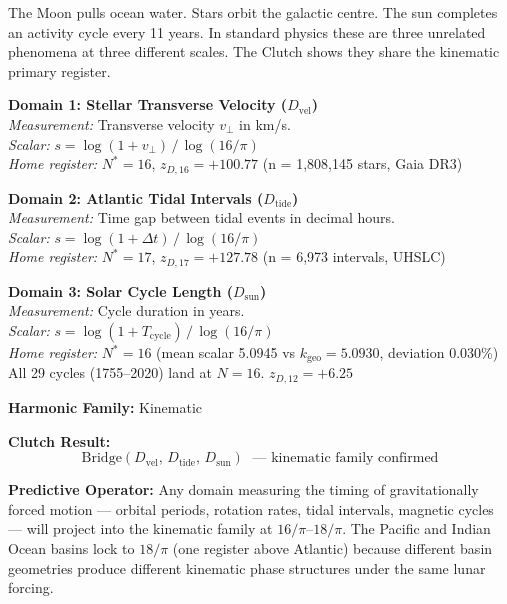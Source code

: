 \documentclass[12pt,oneside]{book}
\begin{document}
\vspace{1em}

\begin{tcolorbox}[colback=green!5, colframe=green!50!black,
    fonttitle=\bfseries,
    title=Rosetta Block 2 — The Kinematic Bridge: Stellar Velocity $\leftrightarrow$ Ocean Tides $\leftrightarrow$ Solar Cycle]

The Moon pulls ocean water. Stars orbit the galactic centre. The sun completes an
activity cycle every 11 years. In standard physics these are three unrelated phenomena
at three different scales. The Clutch shows they share the kinematic primary register.

\medskip
\textbf{Domain 1: Stellar Transverse Velocity ($D_\text{vel}$)}\\
\textit{Measurement:} Transverse velocity $v_\perp$ in km/s.\\
\textit{Scalar:} $s = \log(1 + v_\perp)\,/\,\log(16/\pi)$\\
\textit{Home register:} $N^* = 16$, \quad$z_{D,16} = +100.77$ \quad(n = 1{,}808{,}145 stars, Gaia DR3)

\medskip
\textbf{Domain 2: Atlantic Tidal Intervals ($D_\text{tide}$)}\\
\textit{Measurement:} Time gap between tidal events in decimal hours.\\
\textit{Scalar:} $s = \log(1 + \Delta t)\,/\,\log(16/\pi)$\\
\textit{Home register:} $N^* = 17$, \quad$z_{D,17} = +127.78$ \quad(n = 6{,}973 intervals, UHSLC)

\medskip
\textbf{Domain 3: Solar Cycle Length ($D_\text{sun}$)}\\
\textit{Measurement:} Cycle duration in years.\\
\textit{Scalar:} $s = \log(1 + T_\text{cycle})\,/\,\log(16/\pi)$\\
\textit{Home register:} $N^* = 16$ (mean scalar 5.0945 vs $k_\text{geo} = 5.0930$, deviation 0.030\%)\\
All 29 cycles (1755--2020) land at $N = 16$. \quad$z_{D,12} = +6.25$

\medskip
\textbf{Harmonic Family:} Kinematic

\medskip
\textbf{Clutch Result:}
\[
\text{Bridge}(D_\text{vel},\, D_\text{tide},\, D_\text{sun}) \;\text{ — kinematic family confirmed}
\]

\textbf{Predictive Operator:} Any domain measuring the timing of gravitationally forced
motion — orbital periods, rotation rates, tidal intervals, magnetic cycles — will project
into the kinematic family at $16/\pi$--$18/\pi$. The Pacific and Indian Ocean basins lock
to $18/\pi$ (one register above Atlantic) because different basin geometries produce
different kinematic phase structures under the same lunar forcing.

\end{tcolorbox}
\end{document}
